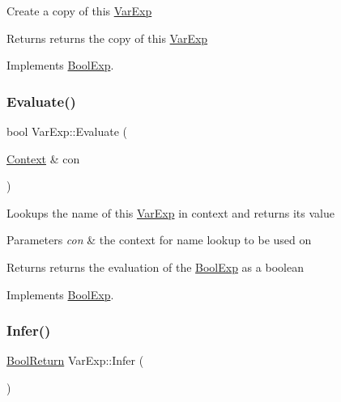 Create a copy of this \mbox{\hyperlink{classVarExp}{Var\+Exp}} \begin{DoxyReturn}{Returns}
returns the copy of this \mbox{\hyperlink{classVarExp}{Var\+Exp}} 
\end{DoxyReturn}


Implements \mbox{\hyperlink{classBoolExp_a846c30d1730cf645a040978a4cf7cdbb}{Bool\+Exp}}.

\mbox{\label{classVarExp_af9d73e76a255123e00d5ebb1ae703188}} 
\subsubsection{\texorpdfstring{Evaluate()}{Evaluate()}}
{\footnotesize\ttfamily bool Var\+Exp\+::\+Evaluate (\begin{DoxyParamCaption}\item[{\mbox{\hyperlink{classContext}{Context}} \&}]{con }\end{DoxyParamCaption})\hspace{0.3cm}{\ttfamily [virtual]}}

Lookups the name of this \mbox{\hyperlink{classVarExp}{Var\+Exp}} in context and returns its value 
\begin{DoxyParams}{Parameters}
{\em con} & the context for name lookup to be used on \\
\hline
\end{DoxyParams}
\begin{DoxyReturn}{Returns}
returns the evaluation of the \mbox{\hyperlink{classBoolExp}{Bool\+Exp}} as a boolean 
\end{DoxyReturn}


Implements \mbox{\hyperlink{classBoolExp_a591fb5f9cb849e0f56e596406a9a10d0}{Bool\+Exp}}.

\mbox{\label{classVarExp_a6c3e1736ade0456d23085923bc3fef61}} 
\subsubsection{\texorpdfstring{Infer()}{Infer()}}
{\footnotesize\ttfamily \mbox{\hyperlink{structBoolReturn}{Bool\+Return}} Var\+Exp\+::\+Infer (\begin{DoxyParamCaption}{ }\end{DoxyParamCaption})\hspace{0.3cm}{\ttfamily [virtual]}}

